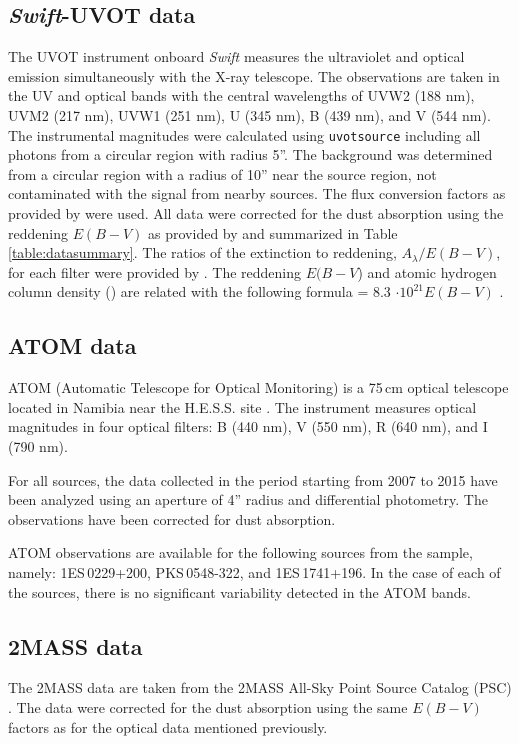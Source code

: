  \subsection*{\textit{Swift}-UVOT data}
The UVOT instrument onboard \textit{Swift}  measures the ultraviolet and optical emission simultaneously with the X-ray telescope.
The observations are taken in the UV and optical  bands with 
the central wavelengths of UVW2 (188 nm), UVM2 (217 nm), UVW1 (251 nm), U (345 nm), B
(439 nm), and V (544 nm). 
The instrumental magnitudes were calculated using \verb|uvotsource| including all photons from a circular region with radius 5''.
The background was determined from a circular region with a radius of 10'' near the source region, not contaminated with the signal from nearby sources. 
The flux conversion factors as provided by \cite{Poole08} were used. 
All data were corrected for the dust absorption using the reddening $E(B-V)$   as provided by \cite{Schlafly} and summarized in Table\,\ref{table:datasummary}. 
The ratios of the extinction to reddening, $A_{\lambda} / E(B-V)$, for each filter were provided by \cite{Giommi06}.
The reddening $E(B-V$) and atomic hydrogen column density (\nh) are related with the following formula \nh = 8.3 $\cdot 10^{21}E(B-V)$ \citep{Liszt2014}.

\noindent

\subsection*{ATOM data}
ATOM (Automatic Telescope for Optical Monitoring) is a 75\,cm optical telescope located in Namibia near the H.E.S.S. site \citep{Hauser2004}.
The instrument measures optical magnitudes in four optical filters: B (440 nm), V (550 nm), R (640 nm), and I (790 nm).

For all sources, the data collected in the period starting from 2007 to 2015 have been analyzed using an aperture of 4'' radius and differential photometry. The observations have been corrected for dust absorption.

ATOM observations are available for the following sources from the sample, namely: 1ES\,0229+200,  PKS\,0548-322, and 1ES\,1741+196. In the case of each of the sources, there is no significant variability detected in the ATOM bands. 

\subsection*{2MASS data}
The 2MASS data are taken from the 2MASS All-Sky Point Source Catalog (PSC) \citep{TwoMassPSC}. 
The data were corrected for the dust absorption using the same $E(B-V)$ factors as for the optical data mentioned previously.

